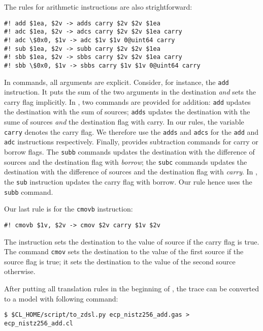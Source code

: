 \documentclass{amsproc}
\begin{document}
The rules for arithmetic instructions are also strightforward:
\begin{verbatim}
#! add $1ea, $2v -> adds carry $2v $2v $1ea
#! adc $1ea, $2v -> adcs carry $2v $2v $1ea carry
#! adc \$0x0, $1v -> adc $1v $1v 0@uint64 carry
#! sub $1ea, $2v -> subb carry $2v $2v $1ea
#! sbb $1ea, $2v -> sbbs carry $2v $2v $1ea carry
#! sbb \$0x0, $1v -> sbbs carry $1v $1v 0@uint64 carry
\end{verbatim}
In \cryptoline commands, all arguments are explicit. Consider, for
instance, the \xeightysix \texttt{add} instruction. It puts the sum of the
two arguments in the destination \emph{and} sets the carry flag
implicitly. In \cryptoline, two commands are provided for addition:
\texttt{add} updates the destination with the sum of sources;
\texttt{adds} updates the destination with the sume of sources
\emph{and} the destination flag with carry. In our rules, the
\cryptoline variable \texttt{carry} denotes the carry flag. We
therefore use the \texttt{adds} and \texttt{adcs} for the \xeightysix
\texttt{add} and \texttt{adc} instructions respectively. Finally,
\cryptoline provides subtraction commands for carry or borrow
flags. The \texttt{subb} commands updates the destination with the
difference of sources and the destination flag with \emph{borrow}; the
\texttt{subc} commands updates the destination with the difference of
sources and the destination flag with \emph{carry}. In \xeightysix, the
\texttt{sub} instruction updates the carry flag with borrow. Our rule
hence uses the \cryptoline \texttt{subb} command.

Our last rule is for the \xeightysix \texttt{cmovb} instruction:
\begin{verbatim}
#! cmovb $1v, $2v -> cmov $2v carry $1v $2v
\end{verbatim}
The instruction sets the destination to the value of source if the
carry flag is true. The \cryptoline command \texttt{cmov} sets the
destination to the value of the first source if the source flag is
true; it sets the destination to the value of the second source
otherwise.

After putting all translation rules in the beginning of \nistzaddgas,
the \xeightysix trace can be converted to a \cryptoline model with
following command:
\begin{verbatim}
$ $CL_HOME/script/to_zdsl.py ecp_nistz256_add.gas > ecp_nistz256_add.cl
\end{verbatim}
\end{document}
